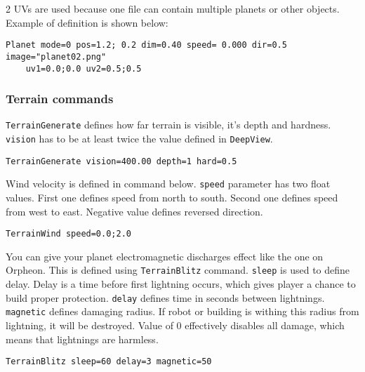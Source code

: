 2 UVs are used because one file can contain multiple planets or other objects. Example of definition is shown below:

\begin{verbatim}
Planet mode=0 pos=1.2; 0.2 dim=0.40 speed= 0.000 dir=0.5 image="planet02.png"
    uv1=0.0;0.0 uv2=0.5;0.5
\end{verbatim}


\subsubsection{Terrain commands}

\texttt{TerrainGenerate} defines how far terrain is visible, it's depth and hardness. \texttt{vision} has to be at least twice the value defined in \texttt{DeepView}.

\begin{verbatim}
TerrainGenerate vision=400.00 depth=1 hard=0.5
\end{verbatim}

Wind velocity is defined in command below. \texttt{speed} parameter has two float values. First one defines speed from north to south. Second one defines speed from west to east. Negative value defines reversed direction.

\begin{verbatim}
TerrainWind speed=0.0;2.0
\end{verbatim}


You can give your planet electromagnetic discharges effect like the one on Orpheon. This is defined using \texttt{TerrainBlitz} command. \texttt{sleep} is used to define delay. Delay is a time before first lightning occurs, which gives player a chance to build proper protection. \texttt{delay} defines time in seconds between lightnings. \texttt{magnetic} defines damaging radius. If robot or building is withing this radius from lightning, it will be destroyed. Value of 0 effectively disables all damage, which means that lightnings are harmless.

\begin{verbatim}
TerrainBlitz sleep=60 delay=3 magnetic=50
\end{verbatim}

